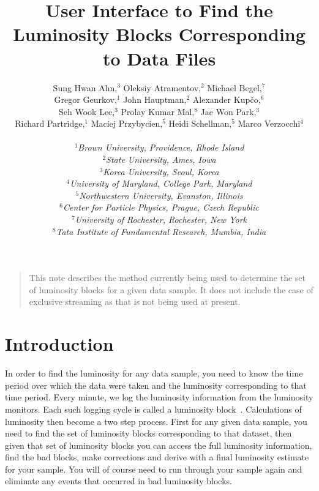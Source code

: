 \documentclass[12pt]{article}
\begin{document}
\title{User Interface to Find the Luminosity Blocks Corresponding to Data Files}
\author{Sung Hwan Ahn,$^3$ 
	Oleksiy Atramentov,$^2$ 
	Michael Begel,$^7$ \\
	Gregor Geurkov,$^1$ 
	John Hauptman,$^2$ 
	Alexander Kup\v{c}o,$^6$ \\
	Seh Wook Lee,$^3$ 
	Prolay Kumar Mal,$^8$ 
	Jae Won Park,$^3$ \\
	Richard Partridge,$^1$
	Maciej Przybycien,$^5$
	Heidi Schellman,$^5$ 
	Marco Verzocchi$^4$
\\
\\ $^1${\it\small Brown University, Providence, Rhode Island}
\\ $^2${\it\small State University, Ames, Iowa}
\\ $^3${\it\small Korea University, Seoul, Korea}
\\ $^4${\it\small University of Maryland, College Park, Maryland}
\\ $^5${\it\small Northwestern University, Evanston, Illinois}
\\ $^6${\it\small Center for Particle Physics, Prague, Czech Republic}
\\ $^7${\it\small University of Rochester, Rochester, New York}
\\ $^8${\it\small Tata Institute of Fundamental Research, Mumbia, India}
}
\maketitle
\thispagestyle{myheadings}

\begin{quote}
This note describes the method currently being used to determine the
set of luminosity blocks for a given data sample.  It does not include
the case of exclusive streaming as that is not being used at present.
\end{quote}

\section{Introduction}

In order to find the luminosity for any data sample, you need to know
the time period over which the data were taken and the luminosity
corresponding to that time period.  Every minute, we log the
luminosity information from the luminosity monitors.  Each such
logging cycle is called a luminosity block~\cite{3971}.  Calculations
of luminosity then become a two step process. First for any given data
sample, you need to find the set of luminosity blocks corresponding to
that dataset, then given that set of luminosity blocks you can access
the full luminosity information, find the bad blocks, make corrections
and derive with a final luminosity estimate for your sample. You will
of course need to run through your sample again and eliminate any
events that occurred in bad luminosity blocks.
\end{document}

